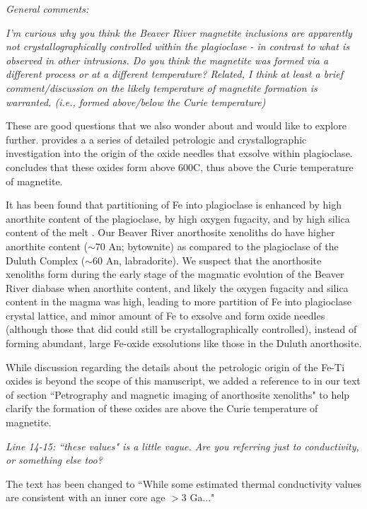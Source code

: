 \documentclass[11pt, letterpaper]{article}
\begin{document}
\begin{flushleft}
\textit{General comments:}

\textit{I'm curious why you think the Beaver River magnetite inclusions are apparently not crystallographically controlled within the plagioclase - in contrast to what is observed in other intrusions. Do you think the magnetite was formed via a different process or at a different temperature? Related, I think at least a brief comment/discussion on the likely temperature of magnetite formation is warranted. (i.e., formed above/below the Curie temperature)}

These are good questions that we also wonder about and would like to explore further. \cite{Ageeva2016a, Ageeva2017a, Ageeva2020a, Bian2021, Ageeva2022a} provides a a series of detailed petrologic and crystallographic investigation into the origin of the oxide needles that exsolve within plagioclase. \cite{Bian2021a} concludes that these oxides form above 600\textdegree C, thus above the Curie temperature of magnetite.

It has been found that partitioning of Fe into plagioclase is enhanced by high anorthite content of the plagioclase, by high oxygen fugacity, and by high silica content of the melt \cite{Phinney1992a, Longhi1976a}. Our Beaver River anorthosite xenoliths do have higher anorthite content ($\sim$70 An; bytownite) as compared to the plagioclase of the Duluth Complex ($\sim$60 An, labradorite). We suspect that the anorthosite xenoliths form during the early stage of the magmatic evolution of the Beaver River diabase when anorthite content, and likely the oxygen fugacity and silica content in the magma was high, leading to more partition of Fe into plagioclase crystal lattice, and minor amount of Fe to exsolve and form oxide needles (although those that did could still be crystallographically controlled), instead of forming abundant, large Fe-oxide exsolutions like those in the Duluth anorthosite. 

While discussion regarding the details about the petrologic origin of the Fe-Ti oxides is beyond the scope of this manuscript, we added a reference to \cite{Bian2021a} in our text of section ``Petrography and magnetic imaging of anorthosite xenoliths" to help clarify the formation of these oxides are above the Curie temperature of magnetite.

\textit{Line 14-15: ``these values" is a little vague. Are you referring just to conductivity, or something else too?}

The text has been changed to ``While some estimated thermal conductivity values are consistent with an inner core age $>$3 Ga..."


\end{flushleft}
\end{document}
